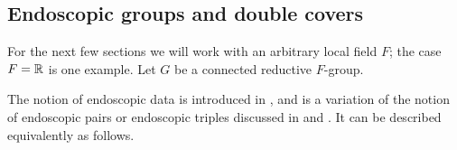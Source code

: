 \documentclass{article}
\theoremstyle{definition}
\numberwithin{equation}{section}
\renewcommand{\-}{\hyp{}}
\begin{document}


\subsection{Endoscopic groups and double covers} \label{sub:covendo}

For the next few sections we will work with an arbitrary local field $F$; the case $F=\mathbb{R}$ is one example. Let $G$ be a connected reductive $F$-group.

The notion of endoscopic data is introduced in \cite[\S1.2]{LS87}, and is a variation of the notion of endoscopic pairs or endoscopic triples discussed in \cite{Kot84} and \cite{Kot86}. It can be described equivalently as follows. 
\end{document}
